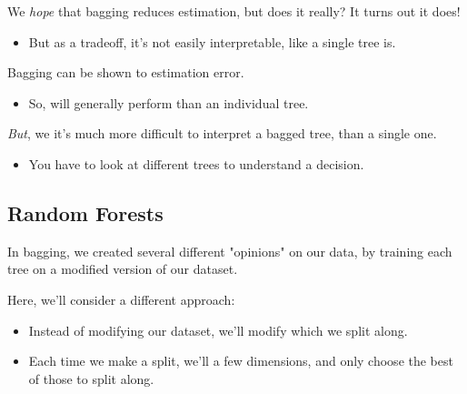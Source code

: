         We \textit{hope} that bagging reduces estimation, but does it really? It turns out it does!

        \begin{itemize}
            \item But as a tradeoff, it's not easily interpretable, like a single tree is.
                \\
        \end{itemize}

        \begin{concept}
            Bagging can be shown to  estimation error.

            \begin{itemize}
                \item So,  will generally perform  than an individual tree.
            \end{itemize}

            \textit{But}, we it's much more difficult to interpret a bagged tree, than a single one.

            \begin{itemize}
                \item You have to look at  different trees to understand a decision.
            \end{itemize}
        \end{concept}





    \pagebreak

    \subsection{Random Forests}

        In bagging, we created several different "opinions" on our data, by training each tree on a modified version of our dataset.

        Here, we'll consider a different approach:

        \begin{itemize}
            \item Instead of modifying our dataset, we'll modify which  we split along.

            \item Each time we make a split, we'll  a few dimensions, and only choose the best of those to split along.
        \end{itemize}

